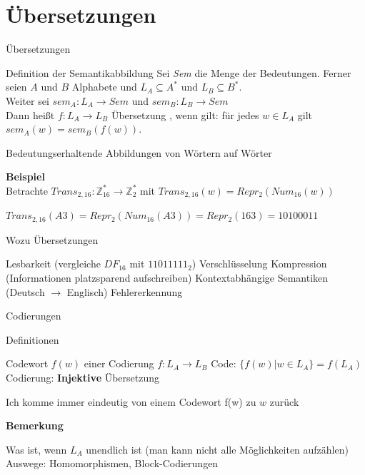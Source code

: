 \def\tutdate{24.11.2016}


\section{Übersetzungen}

\begin{frame} {Übersetzungen}
	\begin{block} {Definition der Semantikabbildung}
		Sei \textit{Sem} die Menge der Bedeutungen. \p Ferner seien $A$ und $B$ Alphabete \p und $L_A \subseteq A^* \text{ und } L_B \subseteq B^*$.\\
		\p Weiter sei $sem_A:L_A \rightarrow Sem$ \p und $sem_B: L_B \rightarrow Sem$\\
		\p Dann heißt $f: L_A \rightarrow L_B$ Übersetzung \p , wenn gilt: für jedes $w \in L_A$ gilt $sem_A(w) = sem_B(f(w))$.
	\end{block}
	\begin{itemize}
		\pitem Bedeutungserhaltende Abbildungen von Wörtern auf Wörter
	\end{itemize}
	\textbf{Beispiel}\\
	\p Betrachte $Trans_{2,16}: \mathbb{Z}_{16}^* \rightarrow \mathbb{Z}_{2}^*$ mit $ Trans_{2,16}(w) = Repr_2(Num_{16}(w))$
	\begin{itemize}
		\pitem $Trans_{2,16}(A3) = Repr_2(Num_{16}(A3)) = Repr_2(163) = 10100011$
	\end{itemize}
\end{frame}
\begin{frame}{Wozu Übersetzungen}
	\begin{itemize}
		\pitem Lesbarkeit (vergleiche $DF_{16}$ mit $11011111_2$)
		\pitem Verschlüsselung
		\pitem Kompression (Informationen platzsparend aufschreiben)
		\pitem Kontextabhängige Semantiken (Deutsch $\rightarrow$ Englisch)
		\pitem Fehlererkennung
	\end{itemize} 
\end{frame}


\begin{frame}{Codierungen}	
	\begin{block}{Definitionen}
		\begin{itemize}
			\pitem Codewort $f(w)$ \p einer Codierung $f: L_A \rightarrow L_B$
			\pitem Code: $\{f(w)|w \in L_A\} = f(L_A)$
			\pitem Codierung: \textbf{Injektive} Übersetzung
			\begin{itemize}
				\pitem Ich komme immer eindeutig von einem Codewort f(w) zu $w$ zurück
			\end{itemize}
		\end{itemize}
	\end{block}\p
	\textbf{Bemerkung}\\
	\begin{itemize}
		\pitem Was ist, wenn $L_A$ unendlich ist (man kann nicht alle Möglichkeiten aufzählen)
		\pitem Auswege: Homomorphismen, Block-Codierungen
	\end{itemize}
\end{frame}


